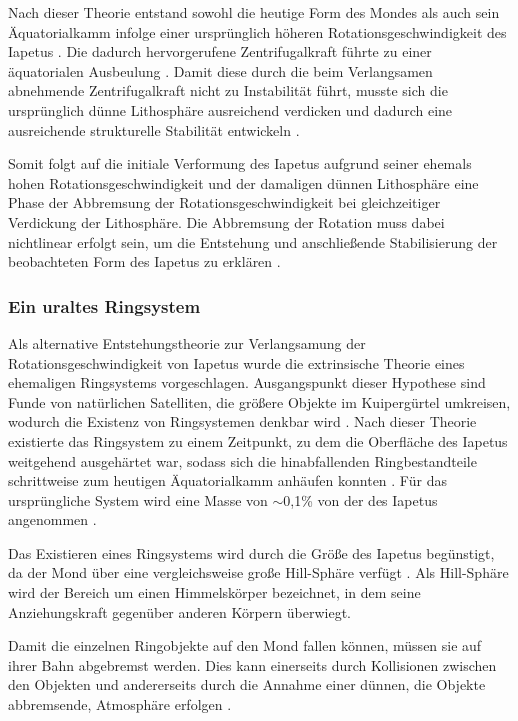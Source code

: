 \documentclass[a4paper,11pt]{article}
\newcommand{\mysubsubsection}[1]{\subsubsection{#1}\label{subsubsec:#1}}
\begin{document}
Nach dieser Theorie entstand sowohl die heutige Form des Mondes als auch sein Äquatorialkamm infolge
einer ursprünglich höheren Rotationsgeschwindigkeit des Iapetus \parencite[182]{Castillo-Rogez_2007}.
Die dadurch hervorgerufene Zentrifugalkraft führte zu einer äquatorialen Ausbeulung \parencite[580]{Thomas_2007}.
Damit diese durch die beim Verlangsamen abnehmende Zentrifugalkraft nicht zu Instabilität führt,
musste sich die ursprünglich dünne Lithosphäre ausreichend verdicken und
dadurch eine ausreichende strukturelle Stabilität entwickeln \parencite[198]{Castillo-Rogez_2007}.

Somit folgt auf die initiale Verformung des Iapetus aufgrund seiner ehemals hohen Rotationsgeschwindigkeit und
der damaligen dünnen Lithosphäre eine Phase der Abbremsung der Rotationsgeschwindigkeit
bei gleichzeitiger Verdickung der Lithosphäre.
Die Abbremsung der Rotation muss dabei nichtlinear erfolgt sein, um die Entstehung und
anschließende Stabilisierung der beobachteten Form des Iapetus zu erklären \parencite[198]{Castillo-Rogez_2007}.





\mysubsubsection{Ein uraltes Ringsystem}

Als alternative Entstehungstheorie zur Verlangsamung der Rotationsgeschwindigkeit
von Iapetus wurde die extrinsische Theorie eines ehemaligen Ringsystems vorgeschlagen.
Ausgangspunkt dieser Hypothese sind Funde von natürlichen Satelliten,
die größere Objekte im Kuipergürtel umkreisen, wodurch die Existenz von Ringsystemen denkbar wird \parencite[4]{Ip_2006}.
Nach dieser Theorie existierte das Ringsystem zu einem Zeitpunkt, zu dem die Oberfläche
des Iapetus weitgehend ausgehärtet war, sodass sich die hinabfallenden Ringbestandteile schrittweise
zum heutigen Äquatorialkamm anhäufen konnten \parencite[3]{Ip_2006}.
Für das ursprüngliche System wird eine Masse von $\sim$0,1\% von der des Iapetus angenommen \parencite[3]{Ip_2006}.

Das Existieren eines Ringsystems wird durch die Größe des Iapetus begünstigt,
da der Mond über eine vergleichsweise große Hill-Sphäre verfügt \parencite[2]{Ip_2006}.
Als Hill-Sphäre wird der Bereich um einen Himmelskörper bezeichnet,
in dem seine Anziehungskraft gegenüber anderen Körpern überwiegt.

Damit die einzelnen Ringobjekte auf den Mond fallen können, müssen sie auf ihrer Bahn abgebremst werden.
Dies kann einerseits durch Kollisionen zwischen den Objekten und andererseits durch die Annahme
einer dünnen, die Objekte abbremsende, Atmosphäre erfolgen \parencite[3]{Ip_2006}.
\end{document}
